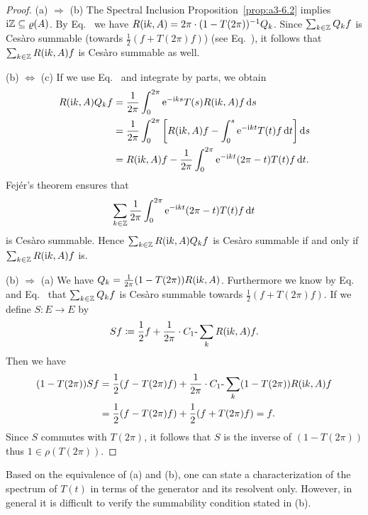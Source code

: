 \begin{proof}
(a) $\Rightarrow$ (b) The Spectral Inclusion Proposition~\ref{prop:a3-6.2} implies $\im\Z \subseteq \rho(A)$.
By Eq.~ we have $R(\mathrm{i} k,A) = 2\pi\cdot(1-T(2\pi))^{-1}Q_{k}$.
Since $\sum_{k\in\mathbb{Z}} Q_{k}f$ is Cesàro summable (\mbox{towards} $\frac{1}{2}(f + T(2\pi)f)$) (see Eq.~), it follows that $\sum_{k\in\mathbb{Z}} R(\mathrm{i} k,A)f$ is Cesàro summable as well.

(b) $\Leftrightarrow$ (c) If we use Eq.~ and integrate by parts, we obtain
\begin{align*}
R(\mathrm{i} k,A)Q_{k}f &= \frac{1}{2\pi}\int_{0}^{2\pi} \mathrm{e}^{-\mathrm{i} ks} T(s)R(\mathrm{i} k,A)f \mathop{}\!\mathrm{d}{s} \\
&= \frac{1}{2\pi}\int_{0}^{2\pi} \left[R(\mathrm{i} k,A)f - \int_{0}^{s} \mathrm{e}^{-\mathrm{i} kt} T(t)f \mathop{}\!\mathrm{d}{t}\right] \mathop{}\!\mathrm{d}{s} \\
&= R(\mathrm{i} k,A)f - \frac{1}{2\pi}\int_{0}^{2\pi} \mathrm{e}^{-\mathrm{i} kt} (2\pi-t) T(t)f \mathop{}\!\mathrm{d}{t} .
\end{align*}
Fejér's theorem ensures that 
%
\[
	 \sum_{k\in\mathbb{Z}} \frac{1}{2\pi}\int_{0}^{2\pi} \mathrm{e}^{-\mathrm{i} kt} (2\pi-t) T(t)f \mathop{}\!\mathrm{d}{t} 
\]
%
is Cesàro summable.
Hence $\sum_{k\in\mathbb{Z}} R(\mathrm{i} k,A)Q_{k}f$ is Cesàro summable if and only if\/ $\sum_{k\in\mathbb{Z}} R(\mathrm{i} k,A)f$ is.

(b) $\Rightarrow$ (a) We have $Q_{k} = \frac{1}{2\pi}(1 - T(2\pi))R(\mathrm{i} k,A)$.
Furthermore we know by Eq.~ and Eq.~  that $\sum_{k\in\mathbb{Z}} Q_{k}f$ is Cesàro summable towards $\frac{1}{2}(f + T(2\pi)f)$.
If we define $S \colon E \to E$ by 
%
\[
	Sf \coloneq \frac{1}{2}f + \frac{1}{2\pi}\cdot C_{1}\text{-}\sum_k R(\mathrm{i} k,A)f .
\]
%
Then we have
\begin{align*}
(1 - T(2\pi))Sf &= \frac{1}{2}(f - T(2\pi)f) + \frac{1}{2\pi}\cdot C_{1}\text{-}\sum_k (1 - T(2\pi))R(\mathrm{i} k,A)f \\
&= \frac{1}{2}(f - T(2\pi)f) + \frac{1}{2}(f + T(2\pi)f) = f .
\end{align*}
Since $S$ commutes with $T(2\pi)$, it follows that $S$ is the inverse of\/ $(1 - T(2\pi))$ thus $1 \in \rho(T(2\pi))$.
\end{proof}
Based on the equivalence of (a) and (b), one can state a characterization of the spectrum of\/ $T(t)$ in terms of the generator and its resolvent only.
However, in general it is difficult to verify the summability condition stated in (b).

